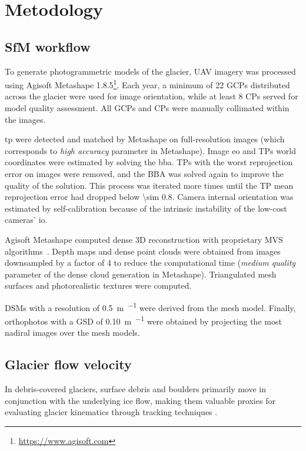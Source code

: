 \section{Metodology}\label{sec:3:methodology}

\subsection{SfM workflow}\label{sec:3:sfm}

To generate photogrammetric models of the glacier, UAV imagery was processed using 
Agisoft Metashape 1.8.5\footnote{\url{https://www.agisoft.com}}.
Each year, a minimum of 22 GCPs distributed across the glacier were used for image 
orientation, while at least 8 CPs served for model quality assessment.  
All GCPs and CPs were manually collimated within the images.

\Ac{tp} were detected and matched by Metashape on full-resolution images (which
corresponds to \textit{high accuracy} parameter in Metashape).
Image \ac{eo} and TPs world coordinates were estimated by solving the
\ac{bba}.
TPs with the worst reprojection error on images were removed, and the BBA was solved again to improve the quality of the solution.
This process was iterated more times until the TP mean reprojection error had dropped below
\SI{\sim 0.8}{\pixel}.
Camera internal orientation was estimated by self-calibration \citep{Fraser2013, Cramer2017} because of the intrinsic instability of the low-cost cameras' \ac{io}.

Agisoft Metashape computed dense 3D reconstruction with proprietary MVS
algorithms~\citep{Dallasta}.
Depth maps and dense point clouds were obtained from images downsampled by a factor of 4 to reduce the computational time (\textit{medium quality} parameter of the dense cloud generation in Metashape).
Triangulated mesh surfaces and photorealistic textures were computed.

DSMs with a resolution of \SI{0.5}{\meter\per\pixel} were derived from the mesh model.
Finally, orthophotos with a GSD of \SI{0.10}{\meter\per\pixel} were obtained by
projecting the most nadiral images over the mesh models.

\subsection{Glacier flow velocity}\label{sec:3:method_velocity}

In debris-covered glaciers, surface debris and boulders primarily move in conjunction with the underlying ice flow, making them valuable proxies for evaluating glacier kinematics through tracking techniques \citep{Dehecq2015, Blothe2021}.

